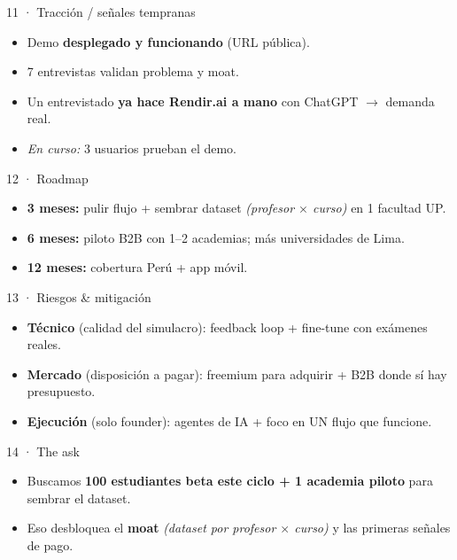 \documentclass[aspectratio=169,11pt]{beamer}
\newcommand{\hi}[1]{\textcolor{amberdeep}{\textbf{#1}}}
\begin{document}
\begin{frame}{11 · Tracción / señales tempranas}
  \large
  \begin{itemize}
    \item Demo \hi{desplegado y funcionando} (URL pública).
    \item 7 entrevistas validan problema y moat.
    \item Un entrevistado \textbf{ya hace Rendir.ai a mano} con ChatGPT $\rightarrow$ demanda real.
    \item \emph{En curso:} 3 usuarios prueban el demo.
  \end{itemize}
\end{frame}

\begin{frame}{12 · Roadmap}
  \large
  \begin{itemize}
    \item \hi{3 meses:} pulir flujo + sembrar dataset \emph{(profesor $\times$ curso)} en 1 facultad UP.
    \item \hi{6 meses:} piloto B2B con 1–2 academias; más universidades de Lima.
    \item \hi{12 meses:} cobertura Perú + app móvil.
  \end{itemize}
\end{frame}

\begin{frame}{13 · Riesgos \& mitigación}
  \large
  \begin{itemize}
    \item \hi{Técnico} (calidad del simulacro): feedback loop + fine-tune con exámenes reales.
    \item \hi{Mercado} (disposición a pagar): freemium para adquirir + B2B donde sí hay presupuesto.
    \item \hi{Ejecución} (solo founder): agentes de IA + foco en UN flujo que funcione.
  \end{itemize}
\end{frame}

\begin{frame}{14 · The ask}
  \large
  \begin{itemize}
    \item Buscamos \hi{100 estudiantes beta este ciclo + 1 academia piloto} para sembrar el dataset.
    \item Eso desbloquea el \textbf{moat} \emph{(dataset por profesor $\times$ curso)} y las primeras señales de pago.
  \end{itemize}
  \vspace{1em}
\end{frame}
\end{document}

